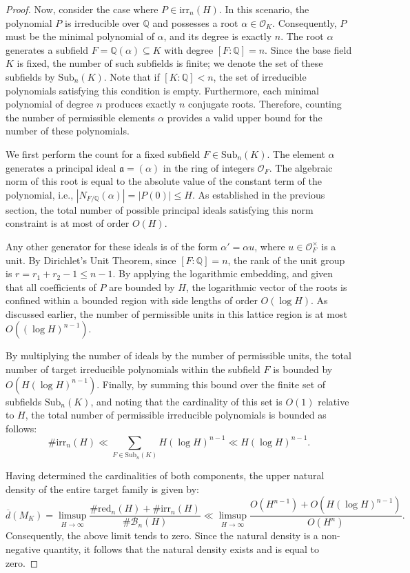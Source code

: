 \documentclass[10pt,a4paper]{amsart}
\newcommand{\OF}{\mathcal{O}_F}
\newcommand{\OK}{\mathcal{O}_K}
\newcommand{\Q}{\mathbb{Q}}
\begin{document}
\begin{proof}
Now, consider the case where $P \in \mathrm{irr}_n(H)$. In this scenario, the polynomial $P$ is irreducible over $\Q$ and possesses a root $\alpha \in \OK$. Consequently, $P$ must be the minimal polynomial of $\alpha$, and its degree is exactly $n$. The root $\alpha$ generates a subfield $F = \Q(\alpha) \subseteq K$ with degree $[F:\Q] = n$. Since the base field $K$ is fixed, the number of such subfields is finite; we denote the set of these subfields by $\mathrm{Sub}_n(K)$. Note that if $[K:\Q] < n$, the set of irreducible polynomials satisfying this condition is empty. Furthermore, each minimal polynomial of degree $n$ produces exactly $n$ conjugate roots. Therefore, counting the number of permissible elements $\alpha$ provides a valid upper bound for the number of these polynomials.

We first perform the count for a fixed subfield $F \in \mathrm{Sub}_n(K)$. The element $\alpha$ generates a principal ideal $\mathfrak{a} = (\alpha)$ in the ring of integers $\OF$. The algebraic norm of this root is equal to the absolute value of the constant term of the polynomial, i.e., $|N_{F/\Q}(\alpha)| = |P(0)| \le H$. As established in the previous section, the total number of possible principal ideals satisfying this norm constraint is at most of order $O(H)$.

Any other generator for these ideals is of the form $\alpha' = \alpha u$, where $u \in \OF^\times$ is a unit. By Dirichlet's Unit Theorem, since $[F:\Q] = n$, the rank of the unit group is $r = r_1 + r_2 - 1 \le n - 1$. By applying the logarithmic embedding, and given that all coefficients of $P$ are bounded by $H$, the logarithmic vector of the roots is confined within a bounded region with side lengths of order $O(\log H)$. As discussed earlier, the number of permissible units in this lattice region is at most $O((\log H)^{n-1})$.

By multiplying the number of ideals by the number of permissible units, the total number of target irreducible polynomials within the subfield $F$ is bounded by $O(H(\log H)^{n-1})$. Finally, by summing this bound over the finite set of subfields $\mathrm{Sub}_n(K)$, and noting that the cardinality of this set is $O(1)$ relative to $H$, the total number of permissible irreducible polynomials is bounded as follows:
\begin{equation*}
    \#\mathrm{irr}_n(H) \ll \sum_{F \in \mathrm{Sub}_n(K)} H(\log H)^{n-1} \ll H(\log H)^{n-1}.
\end{equation*}

Having determined the cardinalities of both components, the upper natural density of the entire target family is given by:
\begin{equation*}
    \overline{d}(M_K) = \limsup_{H \to \infty} \frac{\#\mathrm{red}_n(H) + \#\mathrm{irr}_n(H)}{\#\mathcal{B}_n(H)} \ll \limsup_{H \to \infty} \frac{O(H^{n-1}) + O(H(\log H)^{n-1})}{O(H^n)}.
\end{equation*}
Consequently, the above limit tends to zero. Since the natural density is a non-negative quantity, it follows that the natural density exists and is equal to zero.
\end{proof}
\end{document}

